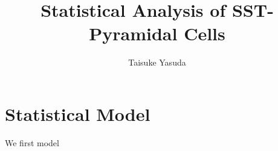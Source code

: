 \documentclass{article}
\title{Statistical Analysis of SST-Pyramidal Cells}
\author{Taisuke Yasuda}
\begin{document}
\maketitle

\section{Statistical Model}

We first model 
\end{document}
